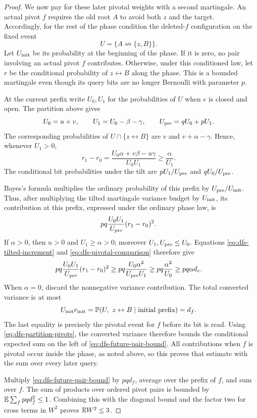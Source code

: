 \begin{proof}
We now pay for these later pivotal weights with a second martingale.
An actual pivot $f$ requires the old root $A$ to avoid both $z$ and the
target. Accordingly, for the rest of the phase condition the deleted-$f$
configuration on the fixed event
\[
 U=\{A\not\leftrightarrow\{z,B\}\}.
\]
Let $U_{\rm init}$ be its probability at the beginning of the phase.
If it is zero, no pair involving an actual pivot $f$ contributes.
Otherwise, under this conditioned law, let $r$ be the conditional
probability of $z\leftrightarrow B$ along the phase. This is a
bounded martingale even though its query bits are no longer Bernoulli
with parameter $p$.

At the current prefix write $U_0,U_1$ for the probabilities of $U$
when $e$ is closed and open. The partition above gives
\[
 U_0=u+v,\qquad U_1=U_0-\beta-\gamma,
 \qquad U_{\rm pre}=qU_0+pU_1.
\]
The corresponding probabilities of $U\cap\{z\leftrightarrow B\}$
are $v$ and $v+\alpha-\gamma$. Hence, whenever $U_1>0$,
\begin{equation}\label{eq:dfs-tilted-increment}
 r_1-r_0
 =\frac{U_0\alpha+v\beta-u\gamma}{U_0U_1}
 \ge\frac\alpha{U_1}.
\end{equation}
The conditional bit probabilities under the tilt are
$pU_1/U_{\rm pre}$ and $qU_0/U_{\rm pre}$.

Bayes's formula multiplies the ordinary probability of this prefix by
$U_{\rm pre}/U_{\rm init}$. Thus, after multiplying the tilted
martingale variance budget by $U_{\rm init}$, its contribution at
this prefix, expressed under the ordinary phase law, is
\[
 pq\frac{U_0U_1}{U_{\rm pre}}(r_1-r_0)^2.
\]
If $\alpha>0$, then $u>0$ and $U_1\ge\alpha>0$; moreover
$U_1,U_{\rm pre}\le U_0$. Equations
\eqref{eq:dfs-tilted-increment} and
\eqref{eq:dfs-pivotal-comparison} therefore give
\begin{equation}\label{eq:dfs-converted-budget}
 pq\frac{U_0U_1}{U_{\rm pre}}(r_1-r_0)^2
 \ge pq\frac{U_0\alpha^2}{U_{\rm pre}U_1}
 \ge pq\frac{\alpha^2}{U_0}
 \ge pq\alpha d_e.
\end{equation}
When $\alpha=0$, discard the nonnegative variance contribution.
The total converted variance is at most
\[
 U_{\rm init}r_{\rm init}
 =\mathbb P(U,\ z\leftrightarrow B\mid\text{initial prefix})=d_f.
\]
The last equality is precisely the pivotal event for $f$ before its
bit is read. Using \eqref{eq:dfs-partition-pivots}, the converted variance therefore
bounds the conditional expected sum on the left of
\eqref{eq:dfs-future-pair-bound}. All contributions when $f$ is pivotal
occur inside the phase, as noted above, so this proves that estimate
with the sum over every later query.

Multiply \eqref{eq:dfs-future-pair-bound} by $pq d_f$, average over
the prefix of $f$, and sum over $f$. The sum of products over ordered
pivot pairs is bounded by
$\mathbb E\sum_f pq d_f^2\le1$. Combining this with the diagonal bound
and the factor two for cross terms in $W^2$ proves $\mathbb E W^2\le3$.
\end{proof}


